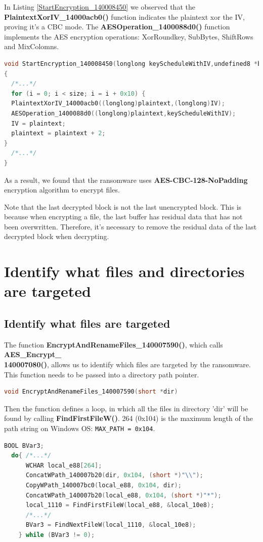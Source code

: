 \documentclass[11pt]{article}
\begin{document}
In Listing \ref{StartEncryption_140008450} we observed that the \textbf{PlaintextXorIV\_14000acb0()} function indicates the plaintext xor the IV, proving it's a CBC mode. The \textbf{AESOperation\_1400088d0()} function implements the AES encryption operations: XorRoundkey, SubBytes, ShiftRows and MixColomns.

\begin{lstlisting}[language=c++, caption=Part of StartEncryption\_140008450, label=StartEncryption_140008450]
void StartEncryption_140008450(longlong keyScheduleWithIV,undefined8 *buffer,uint size)
{
  /*...*/
  for (i = 0; i < size; i = i + 0x10) {
  PlaintextXorIV_14000acb0((longlong)plaintext,(longlong)IV);
  AESOperation_1400088d0((longlong)plaintext,keyScheduleWithIV);
  IV = plaintext;
  plaintext = plaintext + 2;
}
  /*...*/
}
\end{lstlisting}

As a result, we found that the ransomware uses \textbf{AES-CBC-128-NoPadding} encryption algorithm to encrypt files.

Note that the last decrypted block is not the last unencrypted block. This is because when encrypting a file, the last buffer has residual data that has not been overwritten. Therefore, it's necessary to remove the residual data of the last decrypted block when decrypting.

\section{Identify what files and directories are targeted}

\subsection{Identify what files are targeted}
The function \textbf{EncryptAndRenameFiles\_140007590()}, which calls \textbf{AES\_Encrypt\_\\140007080()}, allows us to identify which files are targeted by the ransomware. This function needs to be passed into a directory path pointer.
\begin{lstlisting}[language=c++]
void EncryptAndRenameFiles_140007590(short *dir)
\end{lstlisting}

Then the function defines a loop, in which all the files in directory 'dir' will be found by calling \textbf{FindFirstFileW()}. 264 (0x104) is the maximum length of the path string on Windows OS: \lstinline|MAX_PATH = 0x104|.
\begin{lstlisting}[language=c++]
  BOOL BVar3;
  do{ /*...*/
      WCHAR local_e88[264];
      ConcatWPath_140007b20(dir, 0x104, (short *)"\\");
      CopyWPath_140007bc0(local_e88, 0x104, dir);
      ConcatWPath_140007b20(local_e88, 0x104, (short *)"*");
      local_1110 = FindFirstFileW(local_e88, &local_10e8);
      /*...*/
      BVar3 = FindNextFileW(local_1110, &local_10e8);
    } while (BVar3 != 0);
\end{lstlisting}
\end{document}
